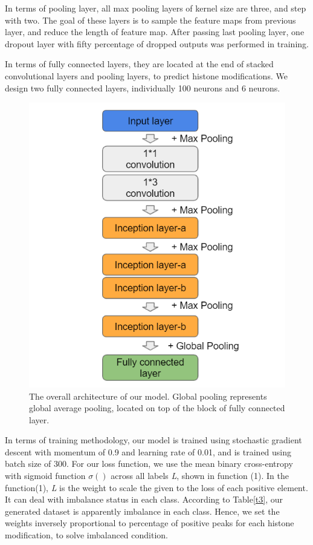 In terms of pooling layer, all max pooling layers of kernel size are three, and step with two. The goal of these layers is to sample the feature maps from previous layer, and reduce the length of feature map. After passing last pooling layer, one dropout layer with fifty percentage of dropped outputs was performed in training.

In terms of fully connected layers, they are located at the end of stacked convolutional layers and pooling layers, to predict histone modifications. We design two fully connected layers, individually 100 neurons and 6 neurons.

\begin{figure}[H]
    \centering
    \includegraphics[width=0.7\columnwidth]{body/figure/figure12.png}
    \captionsetup{labelfont=bf}
    \renewcommand{\baselinestretch}{1.0}
    \caption[Complete architecture]{The overall architecture of our model. Global pooling represents global average pooling, located on top of the block of fully connected layer.}
    \label{f12}
\end{figure}

In terms of training methodology, our model is trained using stochastic gradient descent with momentum of 0.9 and learning rate of 0.01, and is trained using batch size of 300. For our loss function, we use the mean binary cross-entropy with sigmoid function \(\sigma()\) across all labels \emph{L}, shown in function (1). In the function(1), \emph{L} is the weight to scale the given to the loss of each positive element. It can deal with imbalance status in each class. According to Table\ref{t3}, our generated dataset is apparently imbalance in each class. Hence, we set the weights inversely proportional to percentage of positive peaks for each histone modification, to solve imbalanced condition.

